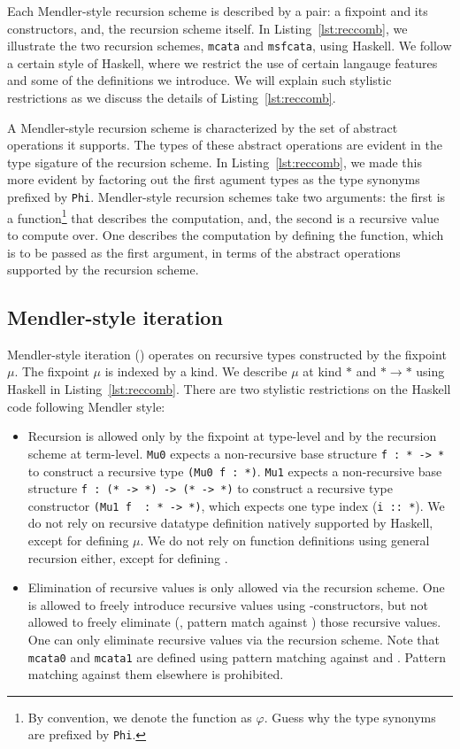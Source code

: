 Each Mendler-style recursion scheme is described by a pair:
a fixpoint and its constructors, and, the recursion scheme itself.
In Listing~\ref{lst:reccomb}, we illustrate the two recursion schemes,
\lstinline{mcata} and \lstinline{msfcata}, using Haskell. We follow
a certain style of Haskell, where we restrict the use of certain langauge
features and some of the definitions we introduce. We will explain such
stylistic restrictions as we discuss the details of Listing~\ref{lst:reccomb}.

A Mendler-style recursion scheme is characterized by
the set of abstract operations it supports. The types of
these abstract operations are evident in the type sigature
of the recursion scheme. In Listing~\ref{lst:reccomb},
we made this more evident by factoring out the first agument types
as the type synonyms prefixed by \lstinline{Phi}.
Mendler-style recursion schemes take two arguments:
the first is a function\footnote{By convention,
	we denote the function as $\varphi$. Guess why
	the type synonyms are prefixed by \lstinline{Phi}.}
that describes the computation, and,
the second is a recursive value to compute over.
One describes the computation by defining the function, which is to be passed
as the first argument, in terms of the abstract operations supported by
the recursion scheme.

\subsection{Mendler-style iteration}
Mendler-style iteration (\MIt{}) operates on recursive types constructed by
the fixpoint $\mu$. The fixpoint $\mu$ is indexed by a kind. We describe
$\mu$ at kind $*$ and $*\to*$ using Haskell in Listing~\ref{lst:reccomb}.
There are two stylistic restrictions on the Haskell code
following Mendler style:
\begin{itemize}
\item Recursion is allowed only by the fixpoint at type-level and
	by the recursion scheme at term-level.
\lstinline{Mu0} expects a non-recursive base structure \lstinline{f : * -> *}
to construct a recursive type \lstinline{(Mu0 f : *)}. \lstinline{Mu1} expects
a non-recursive base structure \lstinline{f : (* -> *) -> (* -> *)}
to construct a recursive type constructor \lstinline{(Mu1 f  : * -> *)},
which expects one type index (\lstinline{i :: *}). We do not rely on
recursive datatype definition natively supported by Haskell, except for
defining $\mu$. We do not rely on function definitions using general recursion
either, except for defining \msfit{}.

\item Elimination of recursive values is only allowed via the recursion scheme.
One is allowed to freely introduce recursive values using \In{}-constructors,
but not allowed to freely eliminate (\ie, pattern match against \In{})
those recursive values. One can only eliminate recursive values via
the recursion scheme. Note that \lstinline{mcata0} and \lstinline{mcata1}
are defined using pattern matching against \In{*} and \In{*\to*}.
Pattern matching against them elsewhere is prohibited.
\end{itemize}

